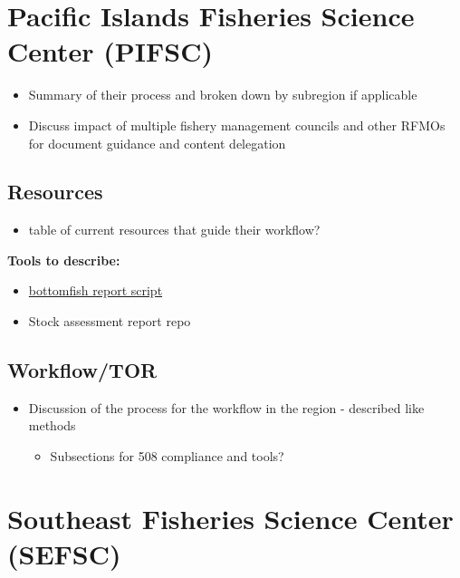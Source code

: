 \documentclass[
  letterpaper,
  oneside,
  open=any]{scrbook}
\providecommand{\tightlist}{%
  \setlength{\itemsep}{0pt}\setlength{\parskip}{0pt}}\usepackage{longtable,booktabs,array}
\begin{document}
\chapter{Pacific Islands Fisheries Science Center
(PIFSC)}\label{pacific-islands-fisheries-science-center-pifsc}

\begin{itemize}
\item
  Summary of their process and broken down by subregion if applicable
\item
  Discuss impact of multiple fishery management councils and other RFMOs
  for document guidance and content delegation
\end{itemize}

\section{Resources}\label{resources-3}

\begin{itemize}
\tightlist
\item
  table of current resources that guide their workflow?
\end{itemize}

\textbf{Tools to describe:}

\begin{itemize}
\item
  \href{https://github.com/PIFSCstockassessments/AmSam-Bottomfish-2023/tree/master/Scripts/03_Report\%20scripts}{bottomfish
  report script}
\item
  Stock assessment report repo
\end{itemize}

\section{Workflow/TOR}\label{workflowtor-1}

\begin{itemize}
\item
  Discussion of the process for the workflow in the region - described
  like methods

  \begin{itemize}
  \tightlist
  \item
    Subsections for 508 compliance and tools?
  \end{itemize}
\end{itemize}


\chapter{Southeast Fisheries Science Center
(SEFSC)}\label{southeast-fisheries-science-center-sefsc}
\end{document}
